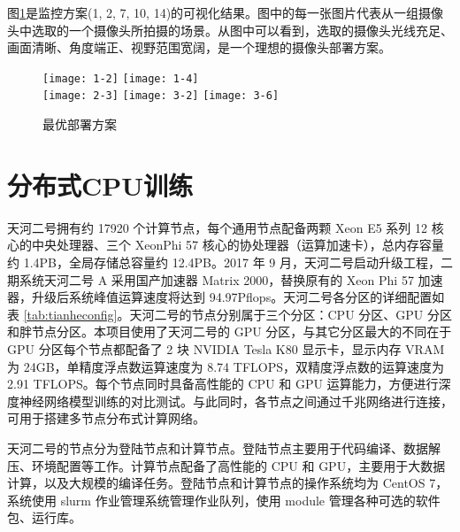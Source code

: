 图\ref{fig:rlresult}是监控方案(1, 2, 7, 10, 14)的可视化结果。图中的每一张图片代表从一组摄像头中选取的一个摄像头所拍摄的场景。从图中可以看到，选取的摄像头光线充足、画面清晰、角度端正、视野范围宽阔，是一个理想的摄像头部署方案。

\begin{figure}[!ht]
    \centering
    \texttt{[image: 1-2]}
    \texttt{[image: 1-4]}\\
    \texttt{[image: 2-3]}
    \texttt{[image: 3-2]}
    \texttt{[image: 3-6]}
    \caption{最优部署方案}
    \label{fig:rlresult}
\end{figure}

\section{分布式CPU训练}

天河二号拥有约 17920 个计算节点，每个通用节点配备两颗 Xeon E5 系列 12 核心的中央处理器、三个 XeonPhi 57 核心的协处理器（运算加速卡），总内存容量约 1.4PB，全局存储总容量约 12.4PB\cite{tianhe2018config}。2017 年 9 月，天河二号启动升级工程，二期系统天河二号 A 采用国产加速器 Matrix 2000，替换原有的 Xeon Phi 57 加速器，升级后系统峰值运算速度将达到 94.97Pflops\cite{tianhe2017summary}。天河二号各分区的详细配置如表 \ref{tab:tianheconfig}。天河二号的节点分别属于三个分区：CPU 分区、GPU 分区和胖节点分区。本项目使用了天河二号的 GPU 分区，与其它分区最大的不同在于 GPU 分区每个节点都配备了 2 块 NVIDIA Tesla K80 显示卡，显示内存 VRAM 为 24GB，单精度浮点数运算速度为 8.74 TFLOPS，双精度浮点数的运算速度为 2.91 TFLOPS。每个节点同时具备高性能的 CPU 和 GPU 运算能力，方便进行深度神经网络模型训练的对比测试。与此同时，各节点之间通过千兆网络进行连接，可用于搭建多节点分布式计算网络。

天河二号的节点分为登陆节点和计算节点。登陆节点主要用于代码编译、数据解压、环境配置等工作。计算节点配备了高性能的 CPU 和 GPU，主要用于大数据计算，以及大规模的编译任务。登陆节点和计算节点的操作系统均为 CentOS 7，系统使用 slurm 作业管理系统管理作业队列，使用 module 管理各种可选的软件包、运行库。

